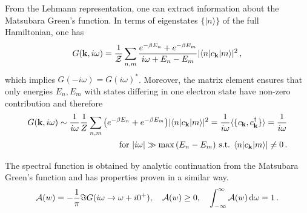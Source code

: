 \documentclass[11pt]{article}
\begin{document}
From the Lehmann representation, one can extract information about the Matsubara Green's function. In terms of eigenstates $\{ | n \rangle \}$ of the full Hamiltonian, one has
%
\begin{equation}
  G(\bold{k},i\omega) = \frac{1}{\mathcal{Z}} \sum_{n,m} \frac{ e^{-\beta E_n} + e^{-\beta E_m} }{i\omega + E_n - E_m} 
	| \langle n | c_{\bold{k}} | m \rangle |^2
\, ,
\end{equation}
%
which implies $G(-i\omega) = G(i\omega)^*$. Moreover, the matrix element ensures that only energies $E_n, E_m$ with states differing in one electron state have non-zero contribution and therefore
%
\begin{align}
\label{G_largefreq}
G(\bold{k},i\omega) \sim \frac{1}{i\omega} \frac{1}{Z} \sum_{n,m} \big( e^{-\beta E_n} + e^{-\beta E_m} \big)
	| \langle n | c_{\bold{k}} | m \rangle |^2 
        = \frac{1}{i\omega} \langle \{ c_\bold{k}, c_\bold{k}^\dag \} \rangle = \frac{1}{i\omega}
\\ \text{for }
| i\omega | \gg \max{(E_n - E_m)} \text{ s.t. } \langle n | c_{\bold{k}} | m \rangle | \neq 0
\, . \nonumber
\end{align}

The spectral function is obtained by analytic continuation from the Matsubara Green's function and has properties proven in a similar way.
%
\begin{equation}
\mathcal{A}(w) = -\frac{1}{\pi} \Im{G(i\omega \rightarrow \omega + i0^+)},
\quad
\mathcal{A}(w) \geq 0,
\quad
\int_{-\infty}^{\infty} \mathcal{A}(w) \dif \omega = 1
\, . \label{eq:Aprops}
\end{equation}
%












\end{document}
